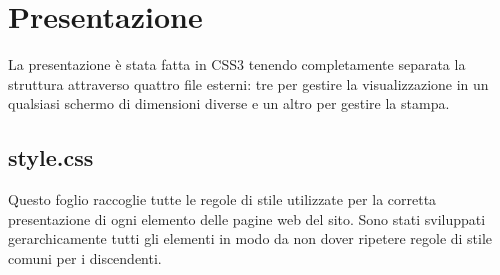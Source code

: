 \section{Presentazione}
La presentazione è stata fatta in CSS3 tenendo completamente separata la struttura attraverso quattro file esterni: tre per gestire la visualizzazione in un qualsiasi schermo di dimensioni diverse e un altro per gestire la stampa.
\subsection{style.css}
Questo foglio raccoglie tutte le regole di stile utilizzate per la corretta presentazione di ogni elemento delle pagine web del sito. Sono stati sviluppati gerarchicamente tutti gli elementi in modo da non dover ripetere regole di stile comuni per i discendenti.